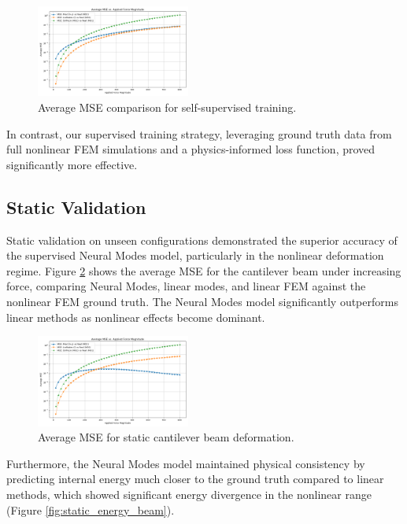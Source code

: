 \documentclass[11pt,a4paper,twocolumn]{article}
\begin{document}
\begin{figure}[H]
    \centering
    \includegraphics[width=0.45\textwidth]{Images/self_supervised_mse.png}
    \caption{Average MSE comparison for self-supervised training.}
    \label{fig:self_supervised_validation_mse_comparison}
\end{figure}

In contrast, our supervised training strategy, leveraging ground truth data from full nonlinear FEM simulations and a physics-informed loss function, proved significantly more effective.

\subsection{Static Validation}
Static validation on unseen configurations demonstrated the superior accuracy of the supervised Neural Modes model, particularly in the nonlinear deformation regime. Figure \ref{fig:static_mse_comparison} shows the average MSE for the cantilever beam under increasing force, comparing Neural Modes, linear modes, and linear FEM against the nonlinear FEM ground truth. The Neural Modes model significantly outperforms linear methods as nonlinear effects become dominant.

\begin{figure}[H]
    \centering
    \includegraphics[width=0.45\textwidth]{Images/beam_static_mse.png}
    \caption{Average MSE for static cantilever beam deformation.}
    \label{fig:static_mse_comparison}
\end{figure}

Furthermore, the Neural Modes model maintained physical consistency by predicting internal energy much closer to the ground truth compared to linear methods, which showed significant energy divergence in the nonlinear range (Figure \ref{fig:static_energy_beam}).
\end{document}
